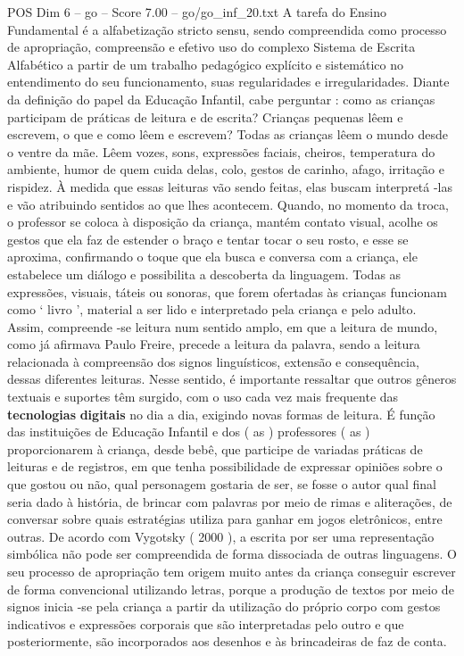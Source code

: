 \begin{textsample}{POS Dim 6 – go – Score 7.00 – go/go\_inf\_20.txt}
A tarefa do Ensino Fundamental é a alfabetização stricto sensu, sendo compreendida como processo de apropriação, compreensão e efetivo uso do complexo Sistema de Escrita Alfabético a partir de um trabalho pedagógico explícito e sistemático no entendimento do seu funcionamento, suas regularidades e irregularidades.
Diante da definição do papel da Educação Infantil, cabe perguntar : como as crianças participam de práticas de leitura e de escrita?
Crianças pequenas lêem e escrevem, o que e como lêem e escrevem?
Todas as crianças lêem o mundo desde o ventre da mãe.
Lêem vozes, sons, expressões faciais, cheiros, temperatura do ambiente, humor de quem cuida delas, colo, gestos de carinho, afago, irritação e rispidez.
À medida que essas leituras vão sendo feitas, elas buscam interpretá -las e vão atribuindo sentidos ao que lhes acontecem.
Quando, no momento da troca, o professor se coloca à disposição da criança, mantém contato visual, acolhe os gestos que ela faz de estender o braço e tentar tocar o seu rosto, e esse se aproxima, confirmando o toque que ela busca e conversa com a criança, ele estabelece um diálogo e possibilita a descoberta da linguagem.
Todas as expressões, visuais, táteis ou sonoras, que forem ofertadas às crianças funcionam como ‘ livro ’, material a ser lido e interpretado pela criança e pelo adulto.
Assim, compreende -se leitura num sentido amplo, em que a leitura de mundo, como já afirmava Paulo Freire, precede a leitura da palavra, sendo a leitura relacionada à compreensão dos signos linguísticos, extensão e consequência, dessas diferentes leituras.
Nesse sentido, é importante ressaltar que outros gêneros textuais e suportes têm surgido, com o uso cada vez mais frequente das \textbf{tecnologias} \textbf{digitais} no dia a dia, exigindo novas formas de leitura.
É função das instituições de Educação Infantil e dos ( as ) professores ( as ) proporcionarem à criança, desde bebê, que participe de variadas práticas de leituras e de registros, em que tenha possibilidade de expressar opiniões sobre o que gostou ou não, qual personagem gostaria de ser, se fosse o autor qual final seria dado à história, de brincar com palavras por meio de rimas e aliterações, de conversar sobre quais estratégias utiliza para ganhar em jogos eletrônicos, entre outras.
De acordo com Vygotsky ( 2000 ), a escrita por ser uma representação simbólica não pode ser compreendida de forma dissociada de outras linguagens.
O seu processo de apropriação tem origem muito antes da criança conseguir escrever de forma convencional utilizando letras, porque a produção de textos por meio de signos inicia -se pela criança a partir da utilização do próprio corpo com gestos indicativos e expressões corporais que são interpretadas pelo outro e que posteriormente, são incorporados aos desenhos e às brincadeiras de faz de conta.

\end{textsample}
